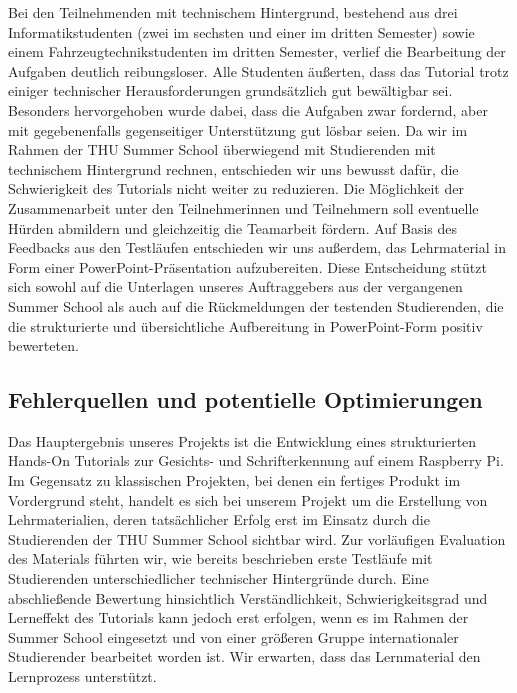Bei den Teilnehmenden mit technischem Hintergrund, bestehend aus drei Informatikstudenten (zwei im sechsten und einer im dritten Semester) sowie einem Fahrzeugtechnikstudenten im dritten Semester, verlief die Bearbeitung der Aufgaben deutlich reibungsloser. Alle Studenten äußerten, dass das Tutorial trotz einiger technischer Herausforderungen grundsätzlich gut bewältigbar sei. Besonders hervorgehoben wurde dabei, dass die Aufgaben zwar fordernd, aber mit gegebenenfalls gegenseitiger Unterstützung gut lösbar seien.
\singlespacing
Da wir im Rahmen der THU Summer School überwiegend mit Studierenden mit technischem Hintergrund rechnen, entschieden wir uns bewusst dafür, die Schwierigkeit des Tutorials nicht weiter zu reduzieren. Die Möglichkeit der Zusammenarbeit unter den Teilnehmerinnen und Teilnehmern soll eventuelle Hürden abmildern und gleichzeitig die Teamarbeit fördern. Auf Basis des Feedbacks aus den Testläufen entschieden wir uns außerdem, das Lehrmaterial in Form einer PowerPoint-Präsentation aufzubereiten. Diese Entscheidung stützt sich sowohl auf die Unterlagen unseres Auftraggebers aus der vergangenen Summer School als auch auf die Rückmeldungen der testenden Studierenden, die die strukturierte und übersichtliche Aufbereitung in PowerPoint-Form positiv bewerteten.
\subsection{Fehlerquellen und potentielle Optimierungen}
Das Hauptergebnis unseres Projekts ist die Entwicklung eines strukturierten Hands-On Tutorials zur Gesichts- und Schrifterkennung auf einem Raspberry Pi. 
Im Gegensatz zu klassischen Projekten, bei denen ein fertiges Produkt im Vordergrund steht, handelt es sich bei unserem Projekt um die Erstellung von Lehrmaterialien, deren tatsächlicher Erfolg erst im Einsatz durch die Studierenden der THU Summer School sichtbar wird. Zur vorläufigen Evaluation des Materials führten wir, wie bereits beschrieben erste Testläufe mit Studierenden unterschiedlicher technischer Hintergründe durch. Eine abschließende Bewertung hinsichtlich Verständlichkeit, Schwierigkeitsgrad und Lerneffekt des Tutorials kann jedoch erst erfolgen, wenn es im Rahmen der Summer School eingesetzt und von einer größeren Gruppe internationaler Studierender bearbeitet worden ist. Wir erwarten, dass das Lernmaterial den Lernprozess unterstützt. 
 